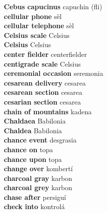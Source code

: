 \textbf{ Cebus capucinus  } capuchin (fli) \\
\textbf{ cellular phone  } sèl \\
\textbf{ cellular telephone  } sèl \\
\textbf{ Celsius scale  } Celsius \\
\textbf{ Celsius  } Celsius \\
\textbf{ center fielder  } centerfielder \\
\textbf{ centigrade scale  } Celsius \\
\textbf{ ceremonial occasion  } seremonia \\
\textbf{ cesarean delivery  } cesarea \\
\textbf{ cesarean section  } cesarea \\
\textbf{ cesarian section  } cesarea \\
\textbf{ chain of mountains  } kadena \\
\textbf{ Chaldaea  } Babilonia \\
\textbf{ Chaldea  } Babilonia \\
\textbf{ chance event  } desgrasia \\
\textbf{ chance on  } topa \\
\textbf{ chance upon  } topa \\
\textbf{ change over  } kombertí \\
\textbf{ charcoal gray  } karbon \\
\textbf{ charcoal grey  } karbon \\
\textbf{ chase after  } persiguí \\
\textbf{ check into  } kontrolá \\
